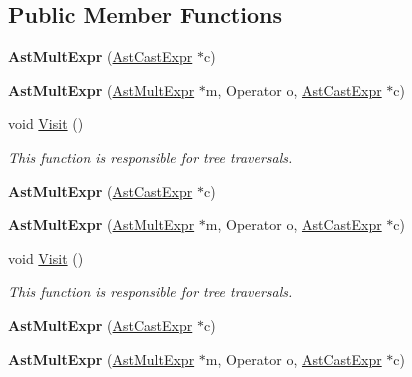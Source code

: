 \subsection*{Public Member Functions}
\begin{DoxyCompactItemize}
\item 
\hypertarget{classAstMultExpr_a5ff1c515cad4ae7084d44d7663a937bc}{{\bfseries Ast\-Mult\-Expr} (\hyperlink{classAstCastExpr}{Ast\-Cast\-Expr} $\ast$c)}\label{classAstMultExpr_a5ff1c515cad4ae7084d44d7663a937bc}

\item 
\hypertarget{classAstMultExpr_a1ef684e47bbad3aa857098807a16ee00}{{\bfseries Ast\-Mult\-Expr} (\hyperlink{classAstMultExpr}{Ast\-Mult\-Expr} $\ast$m, Operator o, \hyperlink{classAstCastExpr}{Ast\-Cast\-Expr} $\ast$c)}\label{classAstMultExpr_a1ef684e47bbad3aa857098807a16ee00}

\item 
void \hyperlink{classAstMultExpr_aea6419ae54b97e882c9a9ab79ca73529}{Visit} ()
\begin{DoxyCompactList}\small\item\em This function is responsible for tree traversals. \end{DoxyCompactList}\item 
\hypertarget{classAstMultExpr_a5ff1c515cad4ae7084d44d7663a937bc}{{\bfseries Ast\-Mult\-Expr} (\hyperlink{classAstCastExpr}{Ast\-Cast\-Expr} $\ast$c)}\label{classAstMultExpr_a5ff1c515cad4ae7084d44d7663a937bc}

\item 
\hypertarget{classAstMultExpr_a1ef684e47bbad3aa857098807a16ee00}{{\bfseries Ast\-Mult\-Expr} (\hyperlink{classAstMultExpr}{Ast\-Mult\-Expr} $\ast$m, Operator o, \hyperlink{classAstCastExpr}{Ast\-Cast\-Expr} $\ast$c)}\label{classAstMultExpr_a1ef684e47bbad3aa857098807a16ee00}

\item 
void \hyperlink{classAstMultExpr_aea6419ae54b97e882c9a9ab79ca73529}{Visit} ()
\begin{DoxyCompactList}\small\item\em This function is responsible for tree traversals. \end{DoxyCompactList}\item 
\hypertarget{classAstMultExpr_a5ff1c515cad4ae7084d44d7663a937bc}{{\bfseries Ast\-Mult\-Expr} (\hyperlink{classAstCastExpr}{Ast\-Cast\-Expr} $\ast$c)}\label{classAstMultExpr_a5ff1c515cad4ae7084d44d7663a937bc}

\item 
\hypertarget{classAstMultExpr_a1ef684e47bbad3aa857098807a16ee00}{{\bfseries Ast\-Mult\-Expr} (\hyperlink{classAstMultExpr}{Ast\-Mult\-Expr} $\ast$m, Operator o, \hyperlink{classAstCastExpr}{Ast\-Cast\-Expr} $\ast$c)}\label{classAstMultExpr_a1ef684e47bbad3aa857098807a16ee00}


\end{DoxyCompactItemize}
